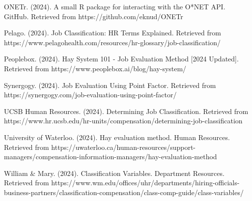 \documentclass[../main.tex]{subfiles}
\begin{document}
\begin{thebibliography}{99}
ONETr. (2024). A small R package for interacting with the O*NET API. GitHub. Retrieved from https://github.com/eknud/ONETr

Pelago. (2024). Job Classification: HR Terms Explained. Retrieved from https://www.pelagohealth.com/resources/hr-glossary/job-classification/

Peoplebox. (2024). Hay System 101 - Job Evaluation Method [2024 Updated]. Retrieved from https://www.peoplebox.ai/blog/hay-system/

Synergogy. (2024). Job Evaluation Using Point Factor. Retrieved from https://synergogy.com/job-evaluation-using-point-factor/

UCSB Human Resources. (2024). Determining Job Classification. Retrieved from https://www.hr.ucsb.edu/hr-units/compensation/determining-job-classification

University of Waterloo. (2024). Hay evaluation method. Human Resources. Retrieved from https://uwaterloo.ca/human-resources/support-managers/compensation-information-managers/hay-evaluation-method

William \& Mary. (2024). Classification Variables. Department Resources. Retrieved from https://www.wm.edu/offices/uhr/departments/hiring-officials-business-partners/classification-compensation/class-comp-guide/class-variables/

\end{thebibliography}
\end{document}

